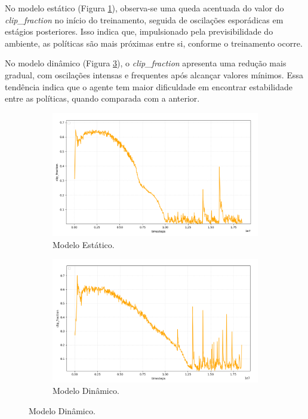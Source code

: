\documentclass[
    12pt,                %
    openright,           %
    oneside,             %
    a4paper,             %
    english,             %
    spanish,             %
    brazil               %
]{ufscar}
\begin{document}
No modelo estático (Figura \ref{fig:ClipFractionESTATICO}), observa-se uma queda acentuada do valor do \textit{clip\_fraction} no início do treinamento, seguida de oscilações esporádicas em estágios posteriores. Isso indica que, impulsionado pela previsibilidade do ambiente, as políticas são mais próximas entre si, conforme o treinamento ocorre.

No modelo dinâmico (Figura \ref{fig:ClipFractionDINAMICO}), o \textit{clip\_fraction} apresenta uma redução mais gradual, com oscilações intensas e frequentes após alcançar valores mínimos. Essa tendência indica que o agente tem maior dificuldade em encontrar estabilidade entre as políticas, quando comparada com a anterior.

\begin{figure}[hbt]
\centering
\caption{\textit{clip\_fraction} no treinamento do AR.}
\label{fig:ClipFraction}
\begin{subfigure}{0.48\textwidth}
    \centering
    \caption{Modelo Estático.}
    \label{fig:ClipFractionESTATICO}
    \includegraphics[width=1\textwidth]{figures/ClipFractionESTATICO.png}
\end{subfigure}
\hfill
\begin{subfigure}{0.48\textwidth}
    \centering
    \caption{Modelo Dinâmico.}
    \label{fig:ClipFractionDINAMICO}
    \includegraphics[width=1\textwidth]{figures/ClipFractionDIN.png}
\end{subfigure}
\end{figure}
\end{document}
